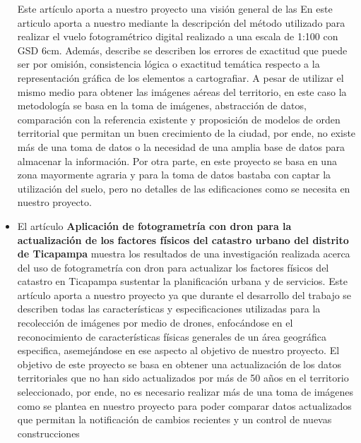 \begin{itemize}
        Este artículo aporta a nuestro proyecto una visión general de las En este articulo aporta a nuestro mediante la descripción del método utilizado para realizar el vuelo fotogramétrico digital realizado a una escala de 1:100 con GSD 6cm. Además, describe se describen los errores de exactitud que puede ser por omisión, consistencia lógica o exactitud temática respecto a la representación gráfica de los elementos a cartografiar.
        A pesar de utilizar el mismo medio para obtener las imágenes aéreas del territorio, en este caso la metodología se basa en la toma de imágenes, abstracción de datos, comparación con la referencia existente y proposición de modelos de orden territorial que permitan un buen crecimiento de la ciudad, por ende, no existe más de una toma de datos o la necesidad de una amplia base de datos para almacenar la información. Por otra parte, en este proyecto se basa en una zona mayormente agraria y para la toma de datos bastaba con captar la utilización del suelo, pero no detalles de las edificaciones como se necesita en nuestro proyecto.
        
        \item El artículo \textbf{Aplicación de fotogrametría con dron para la actualización de los factores físicos del catastro urbano del distrito de Ticapampa } \cite{morales_alvarado_aplicacion_2021}  muestra los resultados de una investigación realizada acerca del uso de fotogrametría con dron para actualizar los factores físicos del catastro en Ticapampa sustentar la planificación urbana y de servicios.
       Este artículo aporta a nuestro proyecto ya que durante el desarrollo del trabajo se describen todas las características y especificaciones utilizadas para la recolección de imágenes por medio de drones, enfocándose en el reconocimiento de características físicas generales de un área geográfica especifica, asemejándose en ese aspecto al objetivo de nuestro proyecto. 
        El objetivo de este proyecto se basa en obtener una actualización de los datos territoriales que no han sido actualizados por más de 50 años en el territorio seleccionado, por ende, no es necesario realizar más de una toma de imágenes como se plantea en nuestro proyecto para poder comparar datos actualizados que permitan la notificación de cambios recientes y un control de nuevas construcciones
        \end{itemize}
